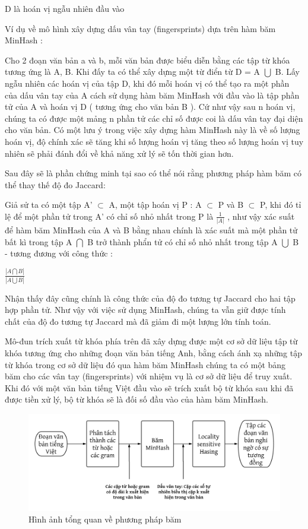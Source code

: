 \documentclass[12pt]{report}
\begin{document}
D là hoán vị ngẫu nhiên đầu vào 
		
\newpage
Ví dụ về mô hình xây dựng dấu vân tay (fingersprints) dựa trên hàm băm MinHash :

Cho 2 đoạn văn bản a và b, mỗi văn bản được biểu diễn bằng các tập từ khóa tương ứng là A, B. Khi đấy ta có thể xây dựng một từ điển từ D = A $\bigcup$ B. Lấy ngẫu nhiên các hoán vị của tập D, khi đó mỗi hoán vị có thể tạo ra một phần của dấu vân tay của A cách sử dụng hàm băm MinHash với đầu vào là tập phần tử của A và hoán vị D ( tương ứng cho văn bản B ). Cứ như vậy sau n hoán vị, chúng ta có được một mảng n phần tử các chỉ số được coi là dấu vân tay đại diện cho văn bản. Có một lưu ý trong việc xây dựng hàm MinHash này là về số lượng hoán vị, độ chính xác sẽ tăng khi số lượng hoán vị tăng theo số lượng hoán vị tuy nhiên sẽ phải đánh đổi về khả năng xử lý sẽ tốn thời gian hơn.

Sau đây sẽ là phần chứng minh tại sao có thể nói rằng phương pháp hàm băm có thể thay thế độ đo Jaccard:

Giả sử ta có một tập A' $\subset$ A, một tập hoán vị P : A $\subset$ P và B $\subset$ P, khi đó tỉ lệ để  một phần tử trong A' có chỉ số nhỏ nhất trong P là $\frac{1}{|A|}$ , như vậy xác suất để hàm băm MinHash của A và B bằng nhau chính là xác suất mà một phần tử bất kì trong tập A $\bigcap$ B trở thành phẩn tử có chỉ số nhỏ nhất trong tập A $\bigcup$ B - tương đương với công thức :
\begin{center}
	$\frac{|A \bigcap B|}{| A \bigcup B|}$
\end{center}

Nhận thấy đây cũng chính là công thức của độ đo tương tự Jaccard cho hai tập hợp phần tử. Như vậy với việc sử dụng MinHash, chúng ta vẫn giữ được tính chất của độ đo tương tự Jaccard mà đã giảm đi một lượng lớn tính toán.

Mô-đun trích xuất từ khóa phía trên đã xây dựng được một cơ sở dữ liệu tập từ khóa tương ứng cho những đoạn văn bản tiếng Anh, bằng cách ánh xạ những tập từ khóa trong cơ sở dữ liệu đó qua hàm băm MinHash chúng ta có một bảng băm cho các vân tay (fingersprints) với nhiệm vụ là cơ sở dữ liệu để truy xuất. Khi đó với một văn bản tiếng Việt đầu vào sẽ trích xuất bộ từ khóa sau khi đã được tiền xử lý, bộ từ khóa sẽ là đối số đầu vào của hàm băm MinHash.

\begin{figure}[h]
	\centering
	\includegraphics[scale=0.6]{lsh_total}
	\caption{Hình ảnh tổng quan về phương pháp băm}
\end{figure}
\end{document}
